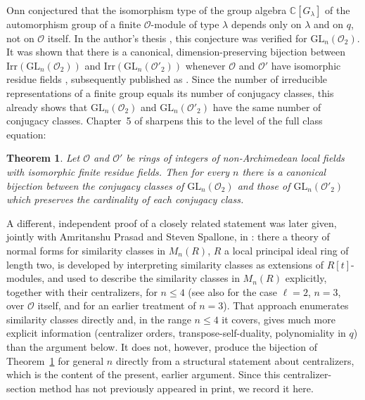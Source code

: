 \documentclass[11pt]{amsart}
\newtheorem{theorem}{Theorem}[section]
\theoremstyle{definition}
\newcommand{\GL}{\mathrm{GL}}
\begin{document}
	Onn \cite[Conjecture~1.2]{Onn08} conjectured that the isomorphism type of
	the group algebra $\mathbb C[G_\lambda]$ of the automorphism group of a
	finite $\mathcal O$-module of type $\lambda$ depends only on $\lambda$ and
	on $q$, not on $\mathcal O$ itself. In the author's thesis \cite{Thesis},
	this conjecture was verified for $\GL_n(\mathcal O_2)$. It was shown that
	there is a canonical, dimension-preserving bijection between
	$\mathrm{Irr}(\GL_n(\mathcal O_2))$ and $\mathrm{Irr}(\GL_n(\mathcal O'_2))$
	whenever $\mathcal O$ and $\mathcal O'$ have isomorphic residue fields
	\cite[Theorem~1.2.1]{Thesis}, subsequently published as \cite{SinglaJA2010}.
	Since the number of irreducible representations of a finite group equals
	its number of conjugacy classes, this already shows that $\GL_n(\mathcal
	O_2)$ and $\GL_n(\mathcal O'_2)$ have the same number of conjugacy classes.
	Chapter~5 of \cite{Thesis} sharpens this to the level of the full class
	equation:
	
	\begin{theorem}\label{thm:main}
		Let $\mathcal O$ and $\mathcal O'$ be rings of integers of non-Archimedean
		local fields with isomorphic finite residue fields. Then for every $n$
		there is a canonical bijection between the conjugacy classes of
		$\GL_n(\mathcal O_2)$ and those of $\GL_n(\mathcal O'_2)$ which preserves
		the cardinality of each conjugacy class.
	\end{theorem}
	
	A different, independent proof of a closely related statement was later
	given, jointly with Amritanshu Prasad and Steven Spallone, in
	\cite{PSS2015}: there a theory of normal forms for similarity classes in
	$M_n(R)$, $R$ a local principal ideal ring of length two, is developed by
	interpreting similarity classes as extensions of $R[t]$-modules, and used
	to describe the similarity classes in $M_n(R)$ explicitly, together with
	their centralizers, for $n\le 4$ (see also \cite{AOPV09} for the case
	$\ell=2$, $n=3$, over $\mathcal O$ itself, and \cite{Nechaev83} for an
	earlier treatment of $n=3$). That approach enumerates similarity classes
	directly and, in the range $n \le 4$ it covers, gives much more explicit
	information (centralizer orders, transpose-self-duality, polynomiality in
	$q$) than the argument below. It does not, however, produce the bijection
	of Theorem~\ref{thm:main} for general $n$ directly from a structural
	statement about centralizers, which is the content of the present, earlier
	argument. Since this centralizer-section method has not previously
	appeared in print, we record it here.
	
\end{document}
